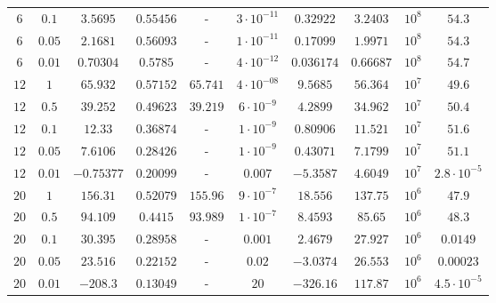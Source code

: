 \documentclass[11pt]{article}
\begin{document}
\begin{table}[H]
{\begin{tabular}{c c c c c c c c c c}
$              6$ &$            0.1$ &$         3.5695$ &$        0.55456$ & -                &$ 3\cdot10^{-11}$ &$        0.32922$ &$         3.2403$ &$          10^8$ &$           54.3$ \\ 
$              6$ &$           0.05$ &$         2.1681$ &$        0.56093$ & -                &$ 1\cdot10^{-11}$ &$        0.17099$ &$         1.9971$ &$          10^8$ &$           54.3$ \\ 
$              6$ &$           0.01$ &$        0.70304$ &$         0.5785$ & -                &$ 4\cdot10^{-12}$ &$       0.036174$ &$        0.66687$ &$          10^8$ &$           54.7$ \\ 
$             12$ &$              1$ &$         65.932$ &$        0.57152$ &$         65.741$ &$ 4\cdot10^{-08}$ &$         9.5685$ &$         56.364$ &$          10^7$ &$           49.6$ \\ 
$             12$ &$            0.5$ &$         39.252$ &$        0.49623$ &$         39.219$ &$  6\cdot10^{-9}$ &$         4.2899$ &$         34.962$ &$          10^7$ &$           50.4$ \\ 
$             12$ &$            0.1$ &$          12.33$ &$        0.36874$ & -                &$  1\cdot10^{-9}$ &$        0.80906$ &$         11.521$ &$          10^7$ &$           51.6$ \\ 
$             12$ &$           0.05$ &$         7.6106$ &$        0.28426$ & -                &$  1\cdot10^{-9}$ &$        0.43071$ &$         7.1799$ &$          10^7$ &$           51.1$ \\ 
$             12$ &$           0.01$ &$       -0.75377$ &$        0.20099$ & -                &$          0.007$ &$        -5.3587$ &$         4.6049$ &$          10^7$ &$    2.8\cdot10^{-5}$ \\ 
$             20$ &$              1$ &$         156.31$ &$        0.52079$ &$         155.96$ &$  9\cdot10^{-7}$ &$         18.556$ &$         137.75$ &$          10^6$ &$           47.9$ \\ 
$             20$ &$            0.5$ &$         94.109$ &$         0.4415$ &$         93.989$ &$  1\cdot10^{-7}$ &$         8.4593$ &$          85.65$ &$          10^6$ &$           48.3$ \\ 
$             20$ &$            0.1$ &$         30.395$ &$        0.28958$ & -                &$          0.001$ &$         2.4679$ &$         27.927$ &$          10^6$ &$         0.0149$ \\ 
$             20$ &$           0.05$ &$         23.516$ &$        0.22152$ & -                &$           0.02$ &$        -3.0374$ &$         26.553$ &$          10^6$ &$        0.00023$ \\ 
$             20$ &$           0.01$ &$         -208.3$ &$        0.13049$ & -                &$             20$ &$        -326.16$ &$         117.87$ &$          10^6$ &$   4.5\cdot10^{-5}$ \\ 
		\hline \hline
	\end{tabular}}
	\label{tab:reg-sampling}
\end{table}
\end{document}
